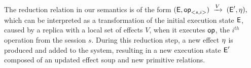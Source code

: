 The reduction relation in our semantics is of the form
{\footnotesize $
({\normalfont \textsf{E}},{\normalfont \textsf{op}}_{<s,i>}) \;\xrightarrow{V}\; ({\normalfont \textsf{E}}', \eta),
$}
which can be interpreted as a transformation of the initial execution state
${\normalfont \textsf{E}}$, caused by a replica with a local 
set of effects $V$, when it executes
${\normalfont \textsf{op}}$, the $i^{th}$ operation from the session $s$. 
During this reduction step, a new effect $\eta$ is produced and added to
the system, resulting in a new execution state ${\normalfont \textsf{E}}'$ composed of an updated effect
soup and new primitive relations.





